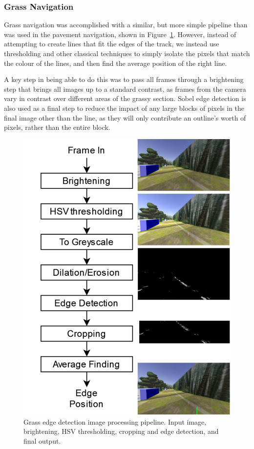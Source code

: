 \documentclass[titlepage, twocolumn]{article}
\begin{document}
        \subsubsection{Grass Navigation}

            Grass navigation was accomplished with a similar, but more simple pipeline than was used in the pavement navigation, shown in Figure~\ref{fig:grasspipeline}. However, instead of attempting to create lines that fit the edges of the track, we instead use thresholding and other classical techniques to simply isolate the pixels that match the colour of the lines, and then find the average position of the right line. 
            
            A key step in being able to do this was to pass all frames through a brightening step that brings all images up to a standard contrast, as frames from the camera vary in contrast over different areas of the grassy section. Sobel edge detection is also used as a final step to reduce the impact of any large blocks of pixels in the final image other than the line, as they will only contribute an outline's worth of pixels, rather than the entire block. 

            \begin{figure}
                \begin{center}
                    \includegraphics[width=0.5\linewidth]{grass-photos.png}
                \end{center}
                \caption{Grass edge detection image processing pipeline. Input image, brightening, HSV thresholding, cropping and edge detection, and final output.}
                \label{fig:grasspipeline}
            \end{figure}
\end{document}
